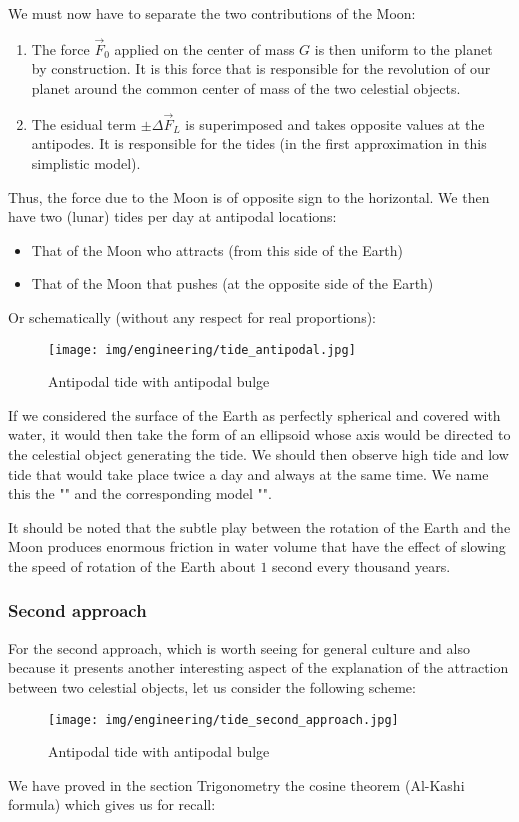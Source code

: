	We must now have to separate the two contributions of the Moon:
	\begin{enumerate}
		\item The force $\vec{F}_0$ applied on the center of mass $G$ is then uniform to the planet by construction. It is this force that is responsible for the revolution of our planet around the common center of mass of the two celestial objects.

		\item The esidual term $\pm \Delta \vec{F}_L$ is superimposed and takes opposite values at the antipodes. It is responsible for the tides (in the first approximation in this simplistic model).
	\end{enumerate}
	Thus, the force due to the Moon is of opposite sign to the horizontal. We then have two (lunar) tides per day at antipodal locations:
	\begin{itemize}
		\item That of the Moon who attracts (from this side of the Earth)

		\item That of the Moon that pushes (at the opposite side of the Earth)
	\end{itemize}
	Or schematically (without any respect for real proportions):
	\begin{figure}[H]
		\centering
		\texttt{[image: img/engineering/tide\_antipodal.jpg]}
		\caption[]{Antipodal tide with antipodal bulge}
	\end{figure}
	If we considered the surface of the Earth as perfectly spherical and covered with water, it would then take the form of an ellipsoid whose axis would be directed to the celestial object generating the tide. We should then observe high tide and low tide that would take place twice a day and always at the same time. We name this the "" and the corresponding model "".

	It should be noted that the subtle play between the rotation of the Earth and the Moon produces enormous friction in water volume that have the effect of slowing the speed of rotation of the Earth about $1$ second every thousand years.
	
	\pagebreak
	\subsubsection{Second approach}
	For the second approach, which is worth seeing for general culture and also because it presents another interesting aspect of the explanation of the attraction between two celestial objects, let us consider the following scheme:
	\begin{figure}[H]
		\centering
		\texttt{[image: img/engineering/tide\_second\_approach.jpg]}
		\caption[]{Antipodal tide with antipodal bulge}
	\end{figure}
	We have proved in the section Trigonometry the cosine theorem (Al-Kashi formula) which gives us for recall:
	
